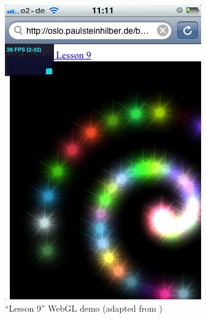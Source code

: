 \documentclass[12pt,journal,compsoc]{IEEEtran}
\begin{document}
\begin{figure}
	\centerline{\includegraphics[width=0.7\columnwidth]{grafiken/lesson9}}
	\caption{“Lesson 9” WebGL demo (adapted from \cite{lesson9})}
	\label{fig:lesson9}
\end{figure}

\ifCLASSOPTIONcaptionsoff
  \newpage
\fi





\end{document}
